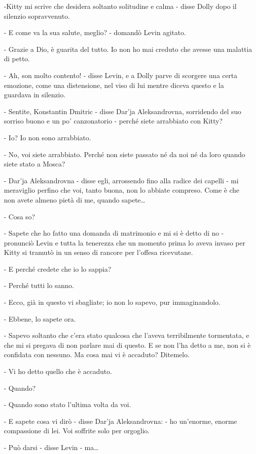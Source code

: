 -Kitty mi scrive che desidera soltanto solitudine e calma - disse Dolly dopo il silenzio sopravvenuto. 

- E come va la sua salute, meglio? - domandò Levin agitato. 

- Grazie a Dio, è guarita del tutto. Io non ho mai creduto che avesse una malattia di petto. 

- Ah, son molto contento! - disse Levin, e a Dolly parve di scorgere una certa emozione, come una distensione, nel viso di lui mentre diceva questo e la guardava in silenzio. 

- Sentite, Konstantin Dmitric - disse Dar'ja Aleksandrovna, sorridendo del suo sorriso buono e un po' canzonatorio - perché siete arrabbiato con Kitty? 

- Io? Io non sono arrabbiato. 

- No, voi siete arrabbiato. Perché non siete passato né da noi né da loro quando siete stato a Mosca? 

- Dar'ja Aleksandrovna - disse egli, arrossendo fino alla radice dei capelli - mi meraviglio perfino che voi, tanto buona, non lo abbiate compreso. Come è che non avete almeno pietà di me, quando sapete\ldots{} 

- Cosa so? 

- Sapete che ho fatto una domanda di matrimonio e mi si è detto di no - pronunciò Levin e tutta la tenerezza che un momento prima lo aveva invaso per Kitty si tramutò in un senso di rancore per l'offesa ricevutane. 

- E perché credete che io lo sappia? 

- Perché tutti lo sanno. 

- Ecco, già in questo vi sbagliate; io non lo sapevo, pur immaginandolo. 

- Ebbene, lo sapete ora. 

- Sapevo soltanto che c'era stato qualcosa che l'aveva terribilmente tormentata, e che mi si pregava di non parlare mai di questo. E se non l'ha detto a me, non si è confidata con nessuno. Ma cosa mai vi è accaduto? Ditemelo. 

- Vi ho detto quello che è accaduto. 

- Quando? 

- Quando sono stato l'ultima volta da voi. 

- E sapete cosa vi dirò - disse Dar'ja Aleksandrovna: - ho un'enorme, enorme compassione di lei. Voi soffrite solo per orgoglio. 

- Può darsi - disse Levin - ma\ldots{} 

